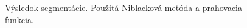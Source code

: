 \documentclass[a4paper,11pt,oneside]{article}%
\begin{document}
\begin{figure}[H]
    \hspace{5px}
    \hspace{5px}
    \caption{Výsledok segmentácie. Použitá Niblacková metóda a prahovacia funkcia.}
    \label{fig:niblack_tf}
\end{figure}
\end{document}
